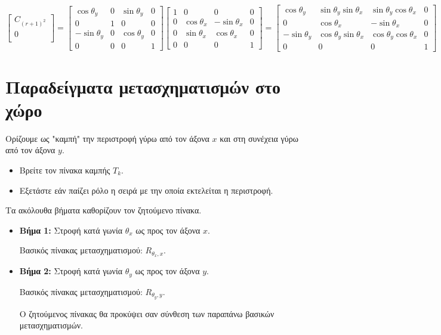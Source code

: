 \[
\begin{bmatrix}
C_{(r+1)^2} \\
0 \\
\end{bmatrix}
=
\begin{bmatrix}
\cos \theta_y & 0 & \sin \theta_y & 0 \\
0 & 1 & 0 & 0 \\
-\sin \theta_y & 0 & \cos \theta_y & 0 \\
0 & 0 & 0 & 1
\end{bmatrix}
\begin{bmatrix}
1 & 0 & 0 & 0 \\
0 & \cos \theta_x & -\sin \theta_x & 0 \\
0 & \sin \theta_x & \cos \theta_x & 0 \\
0 & 0 & 0 & 1
\end{bmatrix}
=
\begin{bmatrix}
\cos \theta_y & \sin \theta_y \sin \theta_x & \sin \theta_y \cos \theta_x & 0 \\
0 & \cos \theta_x & -\sin \theta_x & 0 \\
-\sin \theta_y & \cos \theta_y \sin \theta_x & \cos \theta_y \cos \theta_x & 0 \\
0 & 0 & 0 & 1
\end{bmatrix}
\]

\section{ Παραδείγματα μετασχηματισμών στο χώρο}

\begin{example}
	Ορίζουμε ως "καμπή" την περιστροφή γύρω από τον άξονα \( x \) και στη συνέχεια γύρω από τον άξονα \( y \). 
	
	\begin{itemize}
	    \item Βρείτε τον πίνακα καμπής \( T_k \).
	    \item Εξετάστε εάν παίζει ρόλο η σειρά με την οποία εκτελείται η περιστροφή.
	\end{itemize}
\end{example}

\begin{solution}
	

Τα ακόλουθα βήματα καθορίζουν τον ζητούμενο πίνακα.

\begin{itemize}
    \item \textbf{Βήμα 1:} Στροφή κατά γωνία \( \theta_x \) ως προς τον άξονα \( x \).

    Βασικός πίνακας μετασχηματισμού: \( R_{\theta_x, x} \).

    \item \textbf{Βήμα 2:} Στροφή κατά γωνία \( \theta_y \) ως προς τον άξονα \( y \).

    Βασικός πίνακας μετασχηματισμού: \( R_{\theta_y, y} \).

    Ο ζητούμενος πίνακας θα προκύψει σαν σύνθεση των παραπάνω βασικών μετασχηματισμών.
\end{itemize}

\end{solution}


